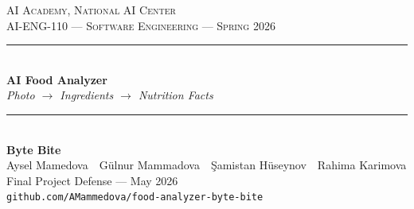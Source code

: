 \documentclass[aspectratio=169,10pt]{beamer}
\newcommand{\teamname}{Byte Bite}
\newcommand{\memberone}{Aysel Mamedova}
\newcommand{\membertwo}{Gülnur Mammadova}
\newcommand{\memberthree}{Şamistan Hüseynov}
\newcommand{\memberfour}{Rahima Karimova}
\newcommand{\repolink}{github.com/AMammedova/food-analyzer-byte-bite}
\newcommand{\coursecode}{AI-ENG-110}
\newcommand{\coursename}{Software Engineering}
\newcommand{\institution}{AI Academy, National AI Center}
\newcommand{\semester}{Spring 2026}
\begin{document}
{
\begin{frame}[plain]
  \begin{center}
    \vspace{0.45cm}
    {\small\color{white!80!accent} \textsc{\institution}}\\[0.3em]
    {\small\color{white!80!accent} \textsc{\coursecode{} --- \coursename{} --- \semester{}}}\\[1em]
    \textcolor{white}{\rule{0.65\textwidth}{0.5pt}}\\[0.6em]
    {\fontsize{28}{32}\bfseries\color{white} AI Food Analyzer}\\[0.3em]
    {\large\color{white!85!accent}\itshape Photo \(\to\) Ingredients \(\to\) Nutrition Facts}\\[0.6em]
    \textcolor{white}{\rule{0.65\textwidth}{0.5pt}}\\[0.8em]
    {\large\bfseries\color{white} \teamname}\\[0.4em]
    {\small\color{white!80!accent}
      \memberone\ \textbullet\
      \membertwo\ \textbullet\
      \memberthree\ \textbullet\
      \memberfour}\\[0.7cm]
    {\footnotesize\color{white!70!accent} Final Project Defense --- May 2026}\\[0.2em]
    {\footnotesize\color{white!70!accent}\texttt{\repolink}}
  \end{center}
\end{frame}
}
\end{document}
